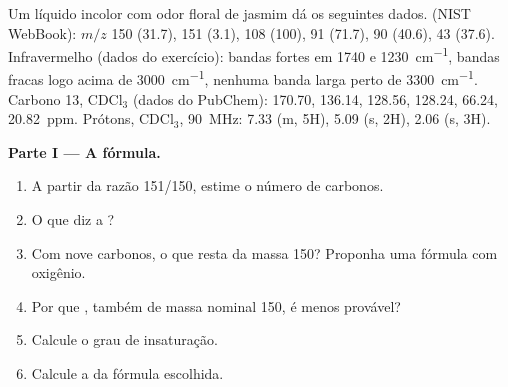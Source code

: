 \begin{problem}
\label{pb:b2:structure-determination:1}
Um líquido incolor com odor floral de jasmim dá os seguintes dados.  (NIST
WebBook): $m/z$ 150 (31.7), 151 (3.1), 108 (100), 91 (71.7), 90 (40.6), 43 (37.6). Infravermelho (dados do
exercício): bandas fortes em 1740 e \qty{1230}{cm^{-1}}, bandas fracas logo acima de \qty{3000}{cm^{-1}},
nenhuma banda larga perto de \qty{3300}{cm^{-1}}. Carbono 13, CDCl$_3$ (dados do PubChem): 170.70, 136.14,
128.56, 128.24, 66.24, 20.82~ppm. Prótons, CDCl$_3$, \qty{90}{MHz}: 7.33 (m, 5H), 5.09 (s, 2H), 2.06 (s, 3H).

\begin{center}
\end{center}

\medskip
\noindent\textbf{Parte I --- A fórmula.}
\begin{enumerate}
  \item A partir da razão 151/150, estime o número de carbonos.
  \item O que diz a ?
  \item Com nove carbonos, o que resta da massa 150? Proponha uma fórmula com oxigênio.
  \item Por que , também de massa nominal 150, é menos provável?
  \item Calcule o grau de insaturação.
  \item Calcule a  da fórmula escolhida.
\end{enumerate}


\end{problem}

